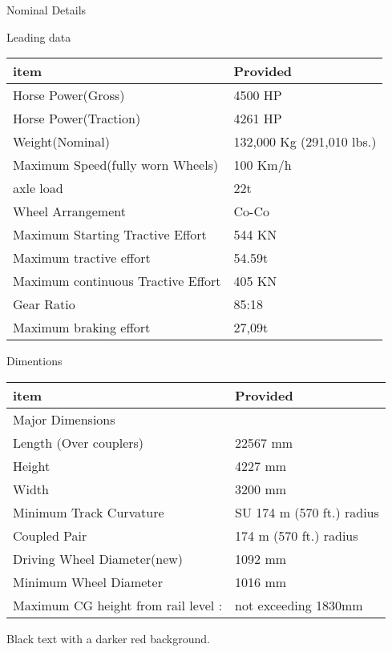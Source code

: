 \documentclass[
  ignorenonframetext,
]{beamer}
\begin{document}
\begin{frame}{Nominal Details}
\protect\hypertarget{nominal-details}{}
\begin{block}{Leading data}
\protect\hypertarget{leading-data}{}
\begin{longtable}[]{@{}ll@{}}
\toprule
item & Provided \\
\midrule
\endhead
Horse Power(Gross) & 4500 HP \\
Horse Power(Traction) & 4261 HP \\
Weight(Nominal) & 132,000 Kg (291,010 lbs.) \\
Maximum Speed(fully worn Wheels) & 100 Km/h \\
axle load & 22t \\
Wheel Arrangement & Co-Co \\
Maximum Starting Tractive Effort & 544 KN \\
Maximum tractive effort & 54.59t \\
Maximum continuous Tractive Effort & 405 KN \\
Gear Ratio & 85:18 \\
Maximum braking effort & 27,09t \\
\bottomrule
\end{longtable}
\end{block}

\begin{block}{Dimentions}
\protect\hypertarget{dimentions}{}
\begin{longtable}[]{@{}ll@{}}
\toprule
item & Provided \\
\midrule
\endhead
Major Dimensions & \\
Length (Over couplers) & 22567 mm \\
Height & 4227 mm \\
Width & 3200 mm \\
Minimum Track Curvature & SU 174 m (570 ft.) radius \\
Coupled Pair & 174 m (570 ft.) radius \\
Driving Wheel Diameter(new) & 1092 mm \\
Minimum Wheel Diameter & 1016 mm \\
Maximum CG height from rail level : & not exceeding 1830mm \\
\bottomrule
\end{longtable}


\begin{shaded}

Black text with a darker red background.


\end{shaded}
\end{block}
\end{frame}
\end{document}

